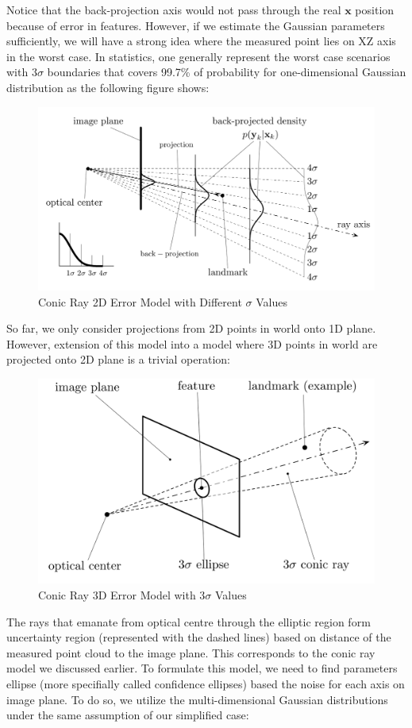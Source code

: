 \documentclass[a4paper]{report}
\numberwithin{figure}{section}
\begin{document}
Notice that the back-projection axis would not pass 
through the real $\mathbf{x}$ position because of error in features. 
However, if we estimate the Gaussian 
parameters sufficiently, we will have a strong idea where the measured
point lies on XZ axis in the worst case. In statistics, one generally represent the 
worst case scenarios with $3\sigma$ boundaries that covers  99.7\% of probability
for one-dimensional Gaussian distribution as the following figure shows:

\begin{figure}[H]
	\centering
  \includegraphics[width=0.7\linewidth,natwidth=640,natheight=640]
  {fig/ref_imgs/conic_ray_2d_model_stds.png}
  \caption{Conic Ray 2D Error Model with Different $\sigma$ Values}
	\label{fig:conic_ray_2d_error_model_stds}
\end{figure}

So far, we only consider projections from 2D points in world onto 1D plane. 
However, extension of this model into a model where 3D points in world are 
projected onto 2D plane is a trivial operation: 

\begin{figure}[H]
	\centering
  \includegraphics[width=0.7\linewidth,natwidth=640,natheight=640]
  {fig/ref_imgs/conic_ray_3d_model.png}
  \caption{Conic Ray 3D Error Model with $3\sigma$ Values}
	\label{fig:conic_ray_3d_error_model}
\end{figure}

The rays that emanate from optical centre through the elliptic region form 
uncertainty region (represented with the dashed lines) 
based on distance of the measured point cloud to the image plane. This 
corresponds to the conic ray model we discussed earlier. To formulate this model, we need to 
find parameters ellipse (more specifially called confidence ellipses) 
based the noise for each axis on image plane.
To do so, we utilize the multi-dimensional Gaussian distributions under the 
same assumption of our simplified case:
\end{document}
